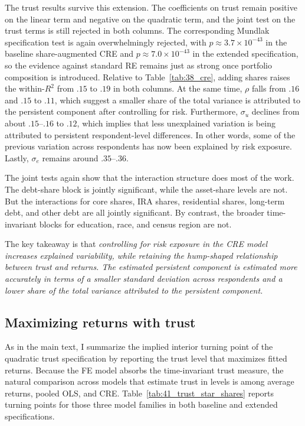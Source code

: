 \par The trust results survive this extension. The coefficients on trust remain positive on the linear term and negative on the quadratic term, and the joint test on the trust terms is still rejected in both columns. The corresponding Mundlak specification test is again overwhelmingly rejected, with $p \approx 3.7\times 10^{-43}$ in the baseline share-augmented CRE and $p \approx 7.0\times 10^{-43}$ in the extended specification, so the evidence against standard RE remains just as strong once portfolio composition is introduced. Relative to Table~\ref{tab:38_cre}, adding shares raises the within-$R^2$ from $.15$ to $.19$ in both columns. At the same time, $\rho$ falls from $.16$ and $.15$ to $.11$, which suggest a smaller share of the total variance is attributed to the persistent component after controlling for risk. Furthermore, $\sigma_u$ declines from about $.15$--$.16$ to $.12$, which implies that less unexplained variation is being attributed to persistent respondent-level differences. In other words, some of the previous variation across respondents has now been explained by risk exposure. Lastly, $\sigma_e$ remains around $.35$--$.36$.

\par The joint tests again show that the interaction structure does most of the work. The debt-share block is jointly significant, while the asset-share levels are not. But the interactions for core shares, IRA shares, residential shares, long-term debt, and other debt are all jointly significant. By contrast, the broader time-invariant blocks for education, race, and census region are not.

\par The key takeaway is that \textit{controlling for risk exposure in the CRE model increases explained variability, while retaining the hump-shaped relationship between trust and returns. The estimated persistent component is estimated more accurately in terms of a smaller standard deviation across respondents and a lower share of the total variance attributed to the persistent component.}

\subsection{Maximizing returns with trust}

\par As in the main text, I summarize the implied interior turning point of the quadratic trust specification by reporting the trust level that maximizes fitted returns. Because the FE model absorbs the time-invariant trust measure, the natural comparison across models that estimate trust in levels is among average returns, pooled OLS, and CRE. Table~\ref{tab:41_trust_star_shares} reports turning points for those three model families in both baseline and extended specifications.

